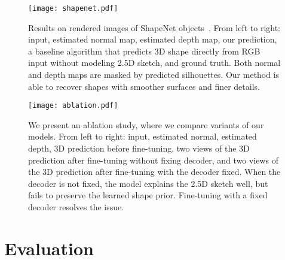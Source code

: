 \documentclass{article}
\begin{document}
\begin{figure}[t]
    \centering
    \texttt{[image: shapenet.pdf]}
    \vspace{-10pt}
    \caption{Results on rendered images of ShapeNet objects~\citep{Chang2015}. From left to right: input, estimated normal map, estimated depth map, our prediction, a baseline algorithm that predicts 3D shape directly from RGB input without modeling 2.5D sketch, and ground truth. Both normal and depth maps are masked by predicted silhouettes. Our method is able to recover shapes with smoother surfaces and finer details.}
    \vspace{-5pt}
    \label{fig:shapenet}
\end{figure} \begin{figure}[t]
    \centering
    \texttt{[image: ablation.pdf]}
    \caption{We present an ablation study, where we compare variants of our models. From left to right: input, estimated normal, estimated depth, 3D prediction before fine-tuning, two views of the 3D prediction after fine-tuning without fixing decoder, and two views of the 3D prediction after fine-tuning with the decoder fixed. When the decoder is not fixed, the model explains the 2.5D sketch well, but fails to preserve the learned shape prior. Fine-tuning with a fixed decoder resolves the issue.}
    \vspace{-5pt}
    \label{fig:ablation}
\end{figure}  \section{Evaluation}
\label{sec:eval}
\end{document}
